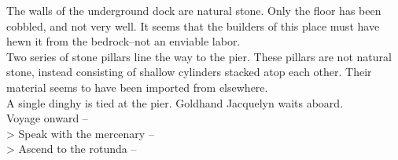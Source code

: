 The walls of the underground dock are natural stone. Only the floor has been cobbled, and not very well. It seems that the builders of this place must have hewn it from the bedrock--not an enviable labor.\\

Two series of stone pillars line the way to the pier. These pillars are not natural stone, instead consisting of shallow cylinders stacked atop each other. Their material seems to have been imported from elsewhere.\\

A single dinghy is tied at the pier. Goldhand Jacquelyn waits aboard.\\

 Voyage onward -- \\
> Speak with the mercenary -- \\
> Ascend to the rotunda -- 